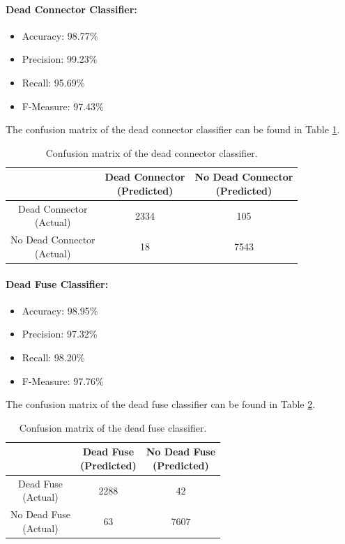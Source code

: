 \paragraph{Dead Connector Classifier:}
\begin{itemize}
  \item Accuracy: 98.77\%
  \item Precision: 99.23\%
  \item Recall: 95.69\%
  \item F-Measure: 97.43\%
\end{itemize}
The confusion matrix of the dead connector classifier can be found in
Table \ref{tbl:confusion-connector}.
\begin{table}[h]
  \centering
  \renewcommand\theadfont{\bfseries}
  \begin{tabular}{|c|c|c|}
    \hline
    & \thead{Dead Connector\\(Predicted)} & \thead{No Dead Connector\\(Predicted)} \\
    \hline
    \thead{Dead Connector\\(Actual)} & 2334 & 105\\
    \hline
    \thead{No Dead Connector\\(Actual)} & 18 & 7543\\
    \hline
  \end{tabular}
  \caption{Confusion matrix of the dead connector classifier.}
  \label{tbl:confusion-connector}
\end{table}

\paragraph{Dead Fuse Classifier:}
\begin{itemize}
  \item Accuracy: 98.95\%
  \item Precision: 97.32\%
  \item Recall: 98.20\%
  \item F-Measure: 97.76\%
\end{itemize}
The confusion matrix of the dead fuse classifier can be found in Table
\ref{tbl:confusion-fuse}.
\begin{table}[h]
  \centering
  \renewcommand\theadfont{\bfseries}
  \begin{tabular}{|c|c|c|}
    \hline
    & \thead{Dead Fuse\\(Predicted)} & \thead{No Dead Fuse\\(Predicted)} \\
    \hline
    \thead{Dead Fuse\\(Actual)} & 2288 & 42\\
    \hline
    \thead{No Dead Fuse\\(Actual)} & 63 & 7607\\
    \hline
  \end{tabular}
  \caption{Confusion matrix of the dead fuse classifier.}
  \label{tbl:confusion-fuse}
\end{table}

